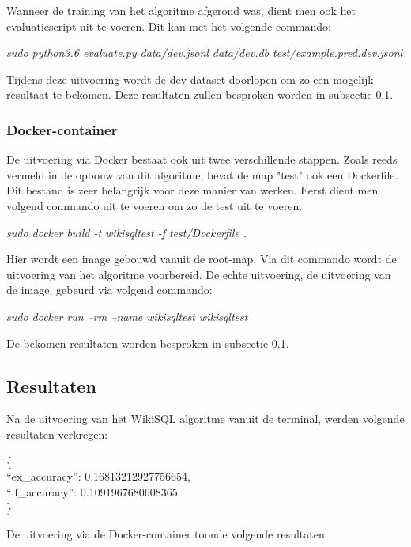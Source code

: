 Wanneer de training van het algoritme afgerond was, dient men ook het evaluatiescript uit te voeren. Dit kan met het volgende commando:
\begin{center}
	\textit{sudo python3.6 evaluate.py data/dev.jsonl data/dev.db test/example.pred.dev.jsonl}
\end{center}

Tijdens deze uitvoering wordt de dev dataset doorlopen om zo een mogelijk resultaat te bekomen. Deze resultaten zullen besproken worden in subsectie \ref{sec:resultwikisql}.

\subsubsection{Docker-container}

De uitvoering via Docker bestaat ook uit twee verschillende stappen. Zoals reeds vermeld in de opbouw van dit algoritme, bevat de map "test" ook een Dockerfile. Dit bestand is zeer belangrijk voor deze manier van werken. Eerst dient men volgend commando uit te voeren om zo de test uit te voeren.
\begin{center}
	\textit{sudo docker build -t wikisqltest -f test/Dockerfile .}
\end{center}

Hier wordt een image gebouwd vanuit de root-map. Via dit commando wordt de uitvoering van het algoritme voorbereid. De echte uitvoering, de uitvoering van de image, gebeurd via volgend commando:
\begin{center}
	\textit{sudo docker run --rm --name wikisqltest wikisqltest}
\end{center}

De bekomen resultaten worden besproken in subsectie \ref{sec:resultwikisql}.

\subsection{Resultaten}
\label{sec:resultwikisql}

Na de uitvoering van het WikiSQL algoritme vanuit de terminal, werden volgende resultaten verkregen:

\{ \\
“ex\_accuracy”: 0.16813212927756654, \\
“lf\_accuracy”: 0.1091967680608365 \\
\}

De uitvoering via de Docker-container toonde volgende resultaten: 

